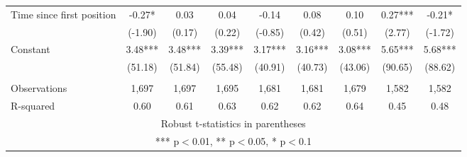 \documentclass[]{article}
\begin{document}
\begin{tabular}{lcccccccc}
Time since first position & -0.27* & 0.03 & 0.04 & -0.14 & 0.08 & 0.10 & 0.27*** & -0.21* \\
 & (-1.90) & (0.17) & (0.22) & (-0.85) & (0.42) & (0.51) & (2.77) & (-1.72) \\
Constant & 3.48*** & 3.48*** & 3.39*** & 3.17*** & 3.16*** & 3.08*** & 5.65*** & 5.68*** \\
 & (51.18) & (51.84) & (55.48) & (40.91) & (40.73) & (43.06) & (90.65) & (88.62) \\
 &  &  &  &  &  &  &  &  \\
Observations & 1,697 & 1,697 & 1,695 & 1,681 & 1,681 & 1,679 & 1,582 & 1,582 \\
 R-squared & 0.60 & 0.61 & 0.63 & 0.62 & 0.62 & 0.64 & 0.45 & 0.48 \\ \hline
\multicolumn{9}{c}{ Robust t-statistics in parentheses} \\
\multicolumn{9}{c}{ *** p$<$0.01, ** p$<$0.05, * p$<$0.1} \\
\end{tabular}
\end{document}

